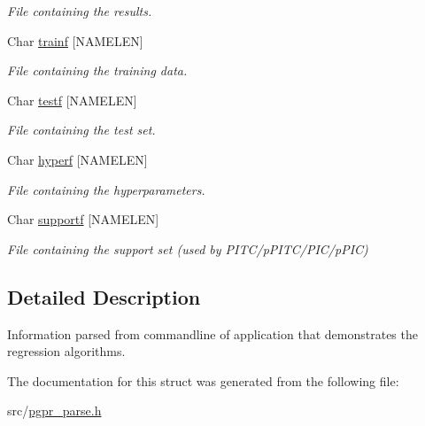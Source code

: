 \begin{DoxyCompactItemize}
\begin{DoxyCompactList}\small\item\em File containing the results. \end{DoxyCompactList}\item 
\hypertarget{structt__command__demo_a4caa14253026ed57aacca438cd672bb0}{Char \hyperlink{structt__command__demo_a4caa14253026ed57aacca438cd672bb0}{trainf} \mbox{[}N\-A\-M\-E\-L\-E\-N\mbox{]}}\label{structt__command__demo_a4caa14253026ed57aacca438cd672bb0}

\begin{DoxyCompactList}\small\item\em File containing the training data. \end{DoxyCompactList}\item 
\hypertarget{structt__command__demo_a84873e5db588a94bca1f35551bf034e4}{Char \hyperlink{structt__command__demo_a84873e5db588a94bca1f35551bf034e4}{testf} \mbox{[}N\-A\-M\-E\-L\-E\-N\mbox{]}}\label{structt__command__demo_a84873e5db588a94bca1f35551bf034e4}

\begin{DoxyCompactList}\small\item\em File containing the test set. \end{DoxyCompactList}\item 
\hypertarget{structt__command__demo_a3b5a4c26250a768829e7e7e3622774dc}{Char \hyperlink{structt__command__demo_a3b5a4c26250a768829e7e7e3622774dc}{hyperf} \mbox{[}N\-A\-M\-E\-L\-E\-N\mbox{]}}\label{structt__command__demo_a3b5a4c26250a768829e7e7e3622774dc}

\begin{DoxyCompactList}\small\item\em File containing the hyperparameters. \end{DoxyCompactList}\item 
\hypertarget{structt__command__demo_a2253b0a9e63110ee5b1839122307e678}{Char \hyperlink{structt__command__demo_a2253b0a9e63110ee5b1839122307e678}{supportf} \mbox{[}N\-A\-M\-E\-L\-E\-N\mbox{]}}\label{structt__command__demo_a2253b0a9e63110ee5b1839122307e678}

\begin{DoxyCompactList}\small\item\em File containing the support set (used by P\-I\-T\-C/p\-P\-I\-T\-C/\-P\-I\-C/p\-P\-I\-C) \end{DoxyCompactList}\end{DoxyCompactItemize}


\subsection{Detailed Description}
Information parsed from commandline of application that demonstrates the regression algorithms. 

The documentation for this struct was generated from the following file\-:\begin{DoxyCompactItemize}
\item 
src/\hyperlink{pgpr__parse_8h}{pgpr\-\_\-parse.\-h}\end{DoxyCompactItemize}
